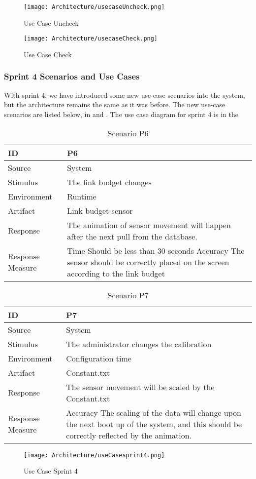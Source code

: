 \documentclass[../document.tex]{subfiles}
\begin{document}
\begin{figure}[H]
	\centering
	\texttt{[image: Architecture/usecaseUncheck.png]}
	\caption{Use Case Uncheck}
\end{figure}

\begin{figure}[H]
	\centering
	\texttt{[image: Architecture/usecaseCheck.png]}
	\caption{Use Case Check}
\end{figure}

\subsubsection{Sprint 4 Scenarios and Use Cases}

With sprint 4, we have introduced some new use-case scenarios into the system, but the architecture remains the same as it was before. The new use-case scenarios are listed below, in  and . The use case diagram for sprint 4 is in the 
\begin{table}[H]
\caption{Scenario P6}
\label{scenario6}
\begin{tabularx}{\textwidth}{|X|X|}
\hline	
ID
&P6
\\ \hline Source
&System
\\ \hline Stimulus
&The link budget changes
\\ \hline Environment
&Runtime
\\ \hline Artifact
&Link budget sensor
\\ \hline Response
&The animation of sensor movement will happen after the next pull from the database.
\\ \hline Response Measure
&Time \newline
Should be less than 30 seconds \newline
Accuracy \newline
The sensor should be correctly placed on the screen according to the link budget
\\ \hline
\end{tabularx}
\end{table}

\begin{table}[H]
\caption{Scenario P7}
\label{scenario7}
\begin{tabularx}{\textwidth}{|X|X|}
\hline	
ID
&P7
\\ \hline Source
&System
\\ \hline Stimulus
&The administrator changes the calibration
\\ \hline Environment
&Configuration time
\\ \hline Artifact
&Constant.txt
\\ \hline Response
&The sensor movement will be scaled by the Constant.txt
\\ \hline Response Measure
&Accuracy \newline
The scaling of the data will change upon the next boot up of the system, and this should be correctly reflected by the animation.
\\ \hline
\end{tabularx}
\end{table}


\begin{figure}[H]
	\centering
	\texttt{[image: Architecture/useCasesprint4.png]}
	\caption{Use Case Sprint 4}
	\label{usecasesprint4}
\end{figure}
\end{document}
